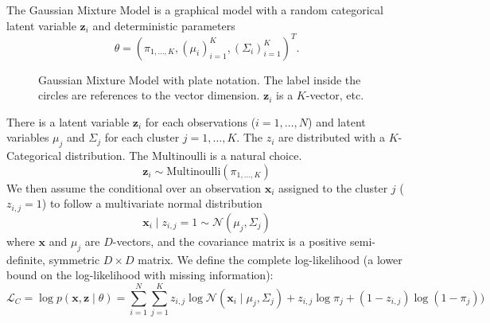 \documentclass{article}
\numberwithin{equation}{section}
\theoremstyle{named}
\begin{document}
The Gaussian Mixture Model is a graphical model with a random categorical latent 
variable $\mathbf{z}_i$ and deterministic parameters 
$$\theta = (\pi_{1,\dots,K}, (\mu_i)_{i = 1}^K, (\Sigma_i)_{i = 1}^K)^T.$$
\begin{figure}[H]
        \centering
        \caption{Gaussian Mixture Model with plate notation. The label inside the circles 
        are references to the vector dimension. $\mathbf{z}_i$ is a $K$-vector, etc.}
        \label{fig:GMM}
\end{figure}



There is a  latent variable $\mathbf{z}_i$ for each observations ($i=1,\dots, N$) and latent variables $\mu_j$ and $\Sigma_j$ for each cluster $j = 1,\dots,K$. The $z_{i}$ are distributed with a $K$-Categorical distribution. The Multinoulli is a natural choice.
$$
  \mathbf{z}_i \sim \text{Multinoulli}(\pi_{1,\dots,K})
$$
We then assume the conditional over an observation $\mathbf{x}_i$ assigned to the cluster $j$ ($z_{i, j} = 1$) to follow a multivariate normal distribution
$$
\mathbf{x}_i \mid z_{i, j} = 1 \sim \mathcal{N}(\mu_j, \Sigma_j)
$$
where $\mathbf{x}$ and $\mu_j$ are $D$-vectors, and the covariance 
matrix is a positive semi-definite, symmetric $D \times D$ matrix. We define 
the complete log-likelihood (a lower bound on the log-likelihood with missing 
information):
$$
\mathcal{L}_C = \log p(\mathbf{x}, \mathbf{z} \mid  \theta) = \sum_{i = 1}^N \sum_{j = 1}^K
    z_{i, j} \log \mathcal{N}(\mathbf{x}_i \mid \mu_j , \Sigma_j) 
    + z_{i, j} \log \pi_j
    + (1 - z_{i, j})\log(1 - \pi_j))
$$
\end{document}
